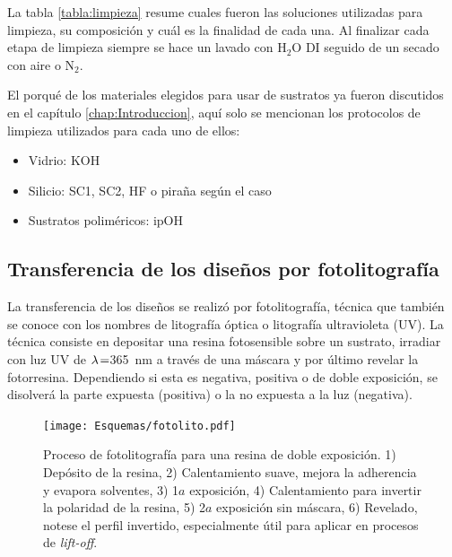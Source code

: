 							
			La tabla \ref{tabla:limpieza} resume cuales fueron las soluciones utilizadas para limpieza, su composición y cuál es la finalidad de cada una. Al finalizar cada etapa de limpieza siempre se hace un lavado con H$_2$O DI seguido de un secado con aire o N$_2$. 

			\pagebreak El porqué de los materiales elegidos para usar de sustratos ya fueron discutidos en el capítulo \ref{chap:Introduccion}, aquí solo se mencionan los protocolos de limpieza\cite{Franssila2004,Kern1990} utilizados para cada uno de ellos:

				\begin{itemize}
					\item{Vidrio: KOH}
					\item{Silicio: SC1, SC2, HF o piraña según el caso}
					\item{Sustratos poliméricos: ipOH}
				\end{itemize}

    \subsection{Transferencia de los diseños por fotolitografía}\label{sec:fotolito}

		La transferencia de los diseños se realizó por fotolitografía, técnica que también se conoce con los nombres de litografía óptica o litografía ultravioleta (UV). La técnica consiste en depositar una resina fotosensible sobre un sustrato, irradiar con luz UV de $\lambda\index{longitud de onda}\!=$\SI{365}{nm} a través de una máscara y por último revelar la fotorresina. Dependiendo si esta es negativa, positiva o de doble exposición, se disolverá la parte expuesta (positiva) o la no expuesta a la luz (negativa). \cite{Jaeger2001,Franssila2004,Mack2007,Mack2006}
				

			  \begin{figure}[b!]
			  \begin{center}
			  \texttt{[image: Esquemas/fotolito.pdf]}
			  \caption[Esquema fotolitografía]{Proceso de fotolitografía para una resina de doble exposición. 1) Depósito de la resina, 2) Calentamiento suave, mejora la adherencia y evapora solventes, 3) 1$a$ exposición, 4) Calentamiento para invertir la polaridad de la resina, 5) 2$a$ exposición sin máscara, 6) Revelado, notese el perfil invertido, especialmente útil para aplicar en procesos de\textit{ lift-off}.}
			  \label{esq:fotolito}
			  \end{center}
			  \end{figure}	

